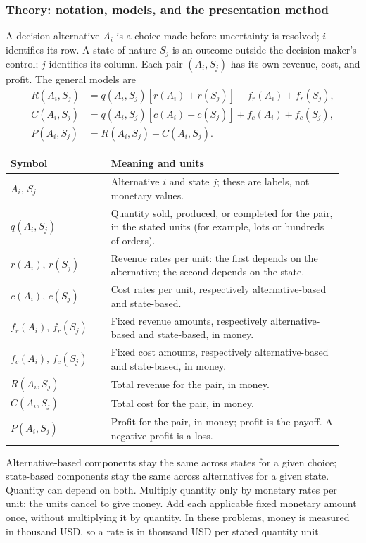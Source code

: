 \subsubsection*{Theory: notation, models, and the presentation method}

A decision alternative \(A_i\) is a choice made before uncertainty is resolved;
\(i\) identifies its row. A state of nature \(S_j\) is an outcome outside the
decision maker's control; \(j\) identifies its column. Each pair \((A_i,S_j)\)
has its own revenue, cost, and profit. The general models are
\[
\begin{aligned}
R(A_i,S_j)&=q(A_i,S_j)[r(A_i)+r(S_j)]+f_r(A_i)+f_r(S_j),\\
C(A_i,S_j)&=q(A_i,S_j)[c(A_i)+c(S_j)]+f_c(A_i)+f_c(S_j),\\
P(A_i,S_j)&=R(A_i,S_j)-C(A_i,S_j).
\end{aligned}
\]

\begin{longtable}{@{}p{0.29\linewidth}p{0.65\linewidth}@{}}
\toprule Symbol & Meaning and units \\ \midrule
\(A_i\), \(S_j\) & Alternative \(i\) and state \(j\); these are labels, not monetary values. \\
\(q(A_i,S_j)\) & Quantity sold, produced, or completed for the pair, in the stated units (for example, lots or hundreds of orders). \\
\(r(A_i)\), \(r(S_j)\) & Revenue rates per unit: the first depends on the alternative; the second depends on the state. \\
\(c(A_i)\), \(c(S_j)\) & Cost rates per unit, respectively alternative-based and state-based. \\
\(f_r(A_i)\), \(f_r(S_j)\) & Fixed revenue amounts, respectively alternative-based and state-based, in money. \\
\(f_c(A_i)\), \(f_c(S_j)\) & Fixed cost amounts, respectively alternative-based and state-based, in money. \\
\(R(A_i,S_j)\) & Total revenue for the pair, in money. \\
\(C(A_i,S_j)\) & Total cost for the pair, in money. \\
\(P(A_i,S_j)\) & Profit for the pair, in money; profit is the payoff. A negative profit is a loss. \\
\bottomrule
\end{longtable}

Alternative-based components stay the same across states for a given choice;
state-based components stay the same across alternatives for a given state.
Quantity can depend on both. Multiply quantity only by monetary rates per unit:
the units cancel to give money. Add each applicable fixed monetary amount once,
without multiplying it by quantity. In these problems, money is measured in
thousand USD, so a rate is in thousand USD per stated quantity unit.

